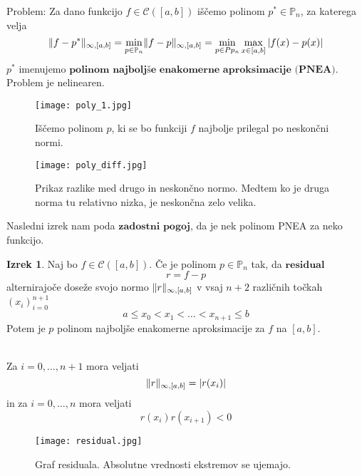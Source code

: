 \documentclass[a4paper,12pt]{article}
\DeclarePairedDelimiter\norm{\lVert}{\rVert}
\theoremstyle{definition}
\newtheorem{theorem}[counter]{Izrek}
\theoremstyle{remark}
\newcommand{\Pp}{\mathbb{P}}
\begin{document}
Problem: Za dano funkcijo $f \in \mathscr{C} ([a, b])$ iščemo polinom $p^* \in \Pp_n$, za katerega velja
\begin{equation*}
    \norm{f - p^*}_{\infty, [a, b]} = \min_{p \in \Pp_n} \norm{f - p}_{\infty, [a, b]} = \min_{p \in Pp_n} \max_{x \in [a, b]} \left| f(x) - p(x) \right|
\end{equation*}
$p^*$ imenujemo $\textbf{polinom najboljše enakomerne aproksimacije (PNEA)}$.
Problem je nelinearen.

\begin{figure}[H]
    \center
    \texttt{[image: poly\_1.jpg]}
    \caption{Iščemo polinom $p$, ki se bo funkciji $f$ najbolje prilegal po neskončni normi.}
\end{figure}

\begin{figure}[H]
    \center
    \texttt{[image: poly\_diff.jpg]}
    \caption{Prikaz razlike med drugo in neskončno normo. Medtem ko je druga norma tu relativno nizka, je neskončna zelo velika.}
\end{figure}

Nasledni izrek nam poda $\textbf{zadostni pogoj}$, da je nek polinom PNEA za neko funkcijo.
\begin{theorem}
    Naj bo $f \in \mathscr{C}([a, b])$. Če je polinom $p \in \Pp_n$ tak, da $\textbf{residual}$
    \begin{equation}
        r = f - p
    \end{equation}
    alternirajoče doseže svojo normo $\norm{r}_{\infty, [a, b]}$ v vsaj $n + 2$ različnih točkah $(x_i)_{i=0}^{n+1}$
    \[a \leq x_0 < x_1 < \dots < x_{n+1} \leq b\]
    Potem je $p$ polinom najboljše enakomerne aproksimacije za $f$ na $[a, b]$.
\end{theorem}

 \\
Za $i = 0, \dots, n+1$ mora veljati
\begin{equation*}
    \norm{r}_{\infty, [a, b]} = \left| r(x_i) \right|
\end{equation*}
in za $i = 0, \dots, n$ mora veljati
\begin{equation*}
    r(x_i)r(x_{i+1}) < 0
\end{equation*}

\begin{figure}[H]
    \center
    \texttt{[image: residual.jpg]}
    \caption{Graf residuala. Absolutne vrednosti ekstremov se ujemajo.}
\end{figure}
\end{document}
